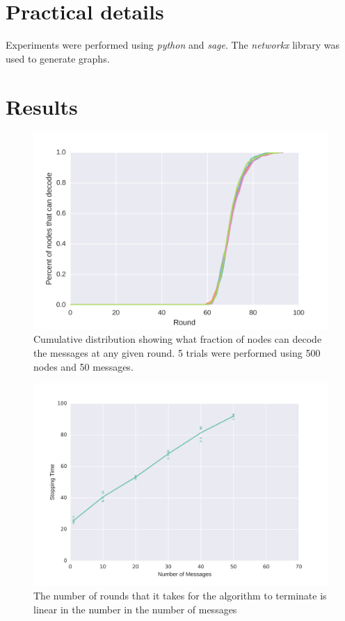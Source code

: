 \documentclass{article} %
\begin{document}
\section{Practical details}
Experiments were performed using \textit{python} and \textit{sage}. The \textit{networkx} library was used to generate graphs.

\section{Results}
\begin{figure}
\centering
\includegraphics[width=\linewidth]{figures/rlnc-ecdf.png}
\caption{Cumulative distribution showing what fraction of nodes can decode the messages at any given round. 5 trials were performed using 500 nodes and 50 messages.}
\label{fig:rlnc-ecdf}
\end{figure} 
\begin{figure}
\centering
\includegraphics[width=\linewidth]{figures/rlnc-vary-k.png}
\caption{The number of rounds that it takes for the algorithm to terminate is linear in the number in the number of messages}
\label{fig:rlnc-vary-k}
\end{figure} 
\end{document}
